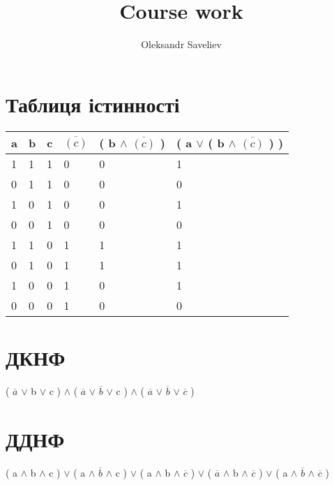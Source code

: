 \documentclass{article}
\title{Course work}
\author{Oleksandr Saveliev}
\begin{document}
\maketitle 
\section{Таблиця істинності}
\begin{tabular}{ | l | l | l | l | l | l |}
\hline 
a & b & c & $\overline{(  c )}$ & ( b $\land$ $\overline{(  c )}$ ) & ( a $\vee$ ( b $\land$ $\overline{(  c )}$ ) )  \\ \hline
1 & 1 & 1 & 0 & 0 & 1  \\
0 & 1 & 1 & 0 & 0 & 0  \\
1 & 0 & 1 & 0 & 0 & 1  \\
0 & 0 & 1 & 0 & 0 & 0  \\
1 & 1 & 0 & 1 & 1 & 1  \\
0 & 1 & 0 & 1 & 1 & 1  \\
1 & 0 & 0 & 1 & 0 & 1  \\
0 & 0 & 0 & 1 & 0 & 0  \\
\hline
\end{tabular}
\section{ДКНФ}
 ( $\overline{a}$ $\vee $ b $\vee $ c ) $\land$ ( $\overline{a}$ $\vee $ $\overline{b}$ $\vee $ c ) $\land$ ( $\overline{a}$ $\vee $ $\overline{b}$ $\vee $ $\overline{c}$ )
\section{ДДНФ}
 ( a $\land$ b $\land$ c ) $\vee $ ( a $\land$ $\overline{b}$ $\land$ c ) $\vee $ ( a $\land$ b $\land$ $\overline{c}$ ) $\vee $ ( $\overline{a}$ $\land$ b $\land$ $\overline{c}$ ) $\vee $ ( a $\land$ $\overline{b}$ $\land$ $\overline{c}$ )
\end{document}
